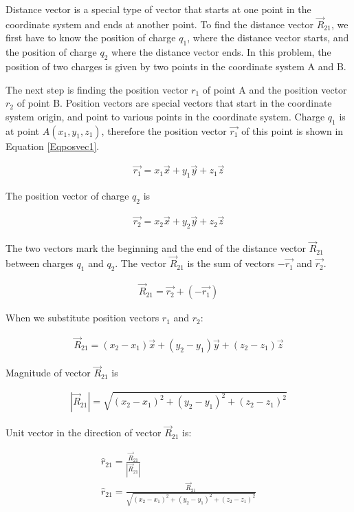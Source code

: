 \documentclass{ximera}
\begin{document}
\begin{example}
\begin{explanation}
Distance vector is a special type of vector that starts at one point in the coordinate system and ends at another point. To find the distance vector $\vec{R}_{21}$, we first have to know the position of charge $q_1$, where the distance vector starts, and the position of charge $q_2$ where the distance vector ends. In this problem, the position of two charges is given by two points in the coordinate system A and B.  

The next step is finding the position vector $r_1$ of point A and the position vector $r_2$ of point B. Position vectors are special vectors that start in the coordinate system origin, and point to various points in the coordinate system. Charge $q_1$ is at point $A(x_1,y_1,z_1)$, therefore the position vector $\vec{r_1}$ of this point is  shown in Equation \ref{Eqposvec1}.


\begin{eqnarray}
\vec{r_1}=x_1 \vec{x} + y_1 \vec{y} +z_1 \vec{z} \label{Eqposvec1}
\end{eqnarray}

The position vector of charge $q_2$ is 

\begin{eqnarray}
\vec{r_2}=x_2\vec{x} + y_2 \vec{y} +z_2 \vec{z}
\end{eqnarray}

The two vectors mark the beginning and the end of the distance vector $\vec{R}_{21}$  between charges $q_1$ and $q_2$. The vector  $\vec{R}_{21}$ is the sum of vectors $-\vec{r_1}$ and $\vec{r_2}$. 



\begin{eqnarray}
\vec{R}_{21}=\vec{r_2} + (-\vec{r_1})
\end{eqnarray}

When we substitute position vectors $r_1$ and $r_2$:

\begin{eqnarray}
\vec{R}_{21}= (x_2 - x_1) \vec{x} +(y_2 - y_1) \vec{y} +(z_2 - z_1) \vec{z}
\end{eqnarray}

Magnitude of vector $\vec{R}_{21}$ is


\begin{eqnarray}
|\vec{R}_{21}|= \sqrt{(x_2 - x_1)^2 +(y_2 - y_1)^2 +(z_2 - z_1)^2}
\end{eqnarray}

Unit vector in the direction of vector $\vec{R}_{21}$ is:


\begin{eqnarray}
\hat{r}_{21}= \frac{\vec{R}_{21}}{|\vec{R}_{21}|} \\
\hat{r}_{21}=\frac{\vec{R}_{21}}{\sqrt{(x_2 - x_1)^2 +(y_2 - y_1)^2 +(z_2 - z_1)^2}}
\end{eqnarray}


\end{explanation}
\end{example}
\end{document}

